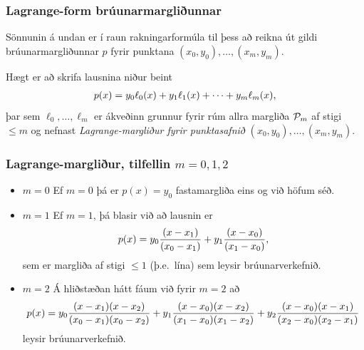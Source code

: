 \documentclass[a4paper,10pt,icelandic]{sphinxmanual}
\begin{document}

\subsubsection{Lagrange-form brúunarmargliðunnar}
\label{kafli03:lagrange-form-bruunarmargliunnar}\label{kafli03:index-7}
Sönnunin á undan er í raun rakningarformúla til þess að reikna út gildi
brúunarmargliðunnar \(p\) fyrir punktana
\((x_0,y_0),\dots,(x_m,y_m)\).

Hægt er að skrifa lausnina niður beint
\begin{gather}
\begin{split}p(x)=y_0\ell_0(x)+y_1\ell_1(x)+\cdots+y_m\ell_m(x),\end{split}\notag
\end{gather}
þar sem \(\ell_0,\dots,\ell_m\) er ákveðinn grunnur fyrir rúm allra
margliða \({\cal P}_m\) af stigi \(\leq m\) og nefnast
\emph{Lagrange-margliður fyrir punktasafnið}
\((x_0,y_0),\dots,(x_m,y_m)\).


\subsubsection{Lagrange-margliður, tilfellin \(m=0,1,2\)}
\label{kafli03:lagrange-margliur-tilfellin}\begin{itemize}
\item {} 
\(m=0\) Ef \(m = 0\) þá er \(p(x) = y_0\) fastamargliða
eins og við höfum séð.

\item {} 
\(m=1\) Ef \(m = 1\), þá blasir við að lausnin er
\begin{gather}
\begin{split}p(x) = y_0 \frac{(x-x_1)}{(x_0-x_1)}
  + y_1 \frac{(x-x_0)}{(x_1-x_0)},\end{split}\notag
\end{gather}
sem er margliða af stigi \(\leq 1\) (þ.e. lína) sem leysir
brúunarverkefnið.

\item {} 
\(m=2\) Á hliðstæðan hátt fáum við fyrir \(m = 2\) að
\begin{gather}
\begin{split}p(x) = y_0 \frac{(x-x_1)(x-x_2)}{(x_0-x_1)(x_0-x_2)}
  + y_1 \frac{(x-x_0)(x-x_2)}{(x_1-x_0)(x_1-x_2)}
  + y_2 \frac{(x-x_0)(x-x_1)}{(x_2-x_0)(x_2-x_1)}\end{split}\notag
\end{gather}
leysir brúunarverkefnið.

\end{itemize}
\end{document}
